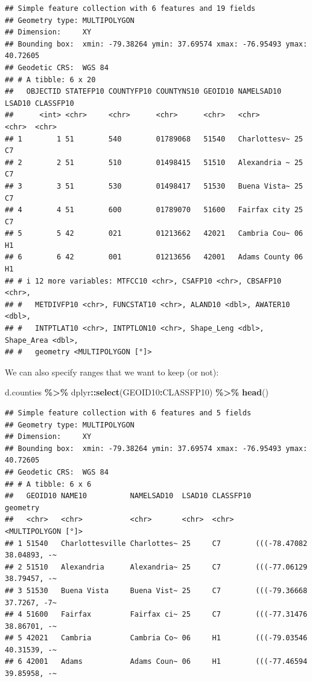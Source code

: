 \documentclass[]{article}
\newenvironment{Shaded}{\begin{snugshade}}{\end{snugshade}}
\newcommand{\FunctionTok}[1]{\textcolor[rgb]{0.13,0.29,0.53}{\textbf{#1}}}
\newcommand{\NormalTok}[1]{#1}
\newcommand{\SpecialCharTok}[1]{\textcolor[rgb]{0.81,0.36,0.00}{\textbf{#1}}}
\begin{document}
\begin{verbatim}
## Simple feature collection with 6 features and 19 fields
## Geometry type: MULTIPOLYGON
## Dimension:     XY
## Bounding box:  xmin: -79.38264 ymin: 37.69574 xmax: -76.95493 ymax: 40.72605
## Geodetic CRS:  WGS 84
## # A tibble: 6 x 20
##   OBJECTID STATEFP10 COUNTYFP10 COUNTYNS10 GEOID10 NAMELSAD10   LSAD10 CLASSFP10
##      <int> <chr>     <chr>      <chr>      <chr>   <chr>        <chr>  <chr>    
## 1        1 51        540        01789068   51540   Charlottesv~ 25     C7       
## 2        2 51        510        01498415   51510   Alexandria ~ 25     C7       
## 3        3 51        530        01498417   51530   Buena Vista~ 25     C7       
## 4        4 51        600        01789070   51600   Fairfax city 25     C7       
## 5        5 42        021        01213662   42021   Cambria Cou~ 06     H1       
## 6        6 42        001        01213656   42001   Adams County 06     H1       
## # i 12 more variables: MTFCC10 <chr>, CSAFP10 <chr>, CBSAFP10 <chr>,
## #   METDIVFP10 <chr>, FUNCSTAT10 <chr>, ALAND10 <dbl>, AWATER10 <dbl>,
## #   INTPTLAT10 <chr>, INTPTLON10 <chr>, Shape_Leng <dbl>, Shape_Area <dbl>,
## #   geometry <MULTIPOLYGON [°]>
\end{verbatim}

We can also specify ranges that we want to keep (or not):

\begin{Shaded}
\begin{Highlighting}[]
\NormalTok{d.counties }\SpecialCharTok{\%\textgreater{}\%}\NormalTok{ dplyr}\SpecialCharTok{::}\FunctionTok{select}\NormalTok{(GEOID10}\SpecialCharTok{:}\NormalTok{CLASSFP10) }\SpecialCharTok{\%\textgreater{}\%} \FunctionTok{head}\NormalTok{() }
\end{Highlighting}
\end{Shaded}

\begin{verbatim}
## Simple feature collection with 6 features and 5 fields
## Geometry type: MULTIPOLYGON
## Dimension:     XY
## Bounding box:  xmin: -79.38264 ymin: 37.69574 xmax: -76.95493 ymax: 40.72605
## Geodetic CRS:  WGS 84
## # A tibble: 6 x 6
##   GEOID10 NAME10          NAMELSAD10  LSAD10 CLASSFP10                  geometry
##   <chr>   <chr>           <chr>       <chr>  <chr>            <MULTIPOLYGON [°]>
## 1 51540   Charlottesville Charlottes~ 25     C7        (((-78.47082 38.04893, -~
## 2 51510   Alexandria      Alexandria~ 25     C7        (((-77.06129 38.79457, -~
## 3 51530   Buena Vista     Buena Vist~ 25     C7        (((-79.36668 37.7267, -7~
## 4 51600   Fairfax         Fairfax ci~ 25     C7        (((-77.31476 38.86701, -~
## 5 42021   Cambria         Cambria Co~ 06     H1        (((-79.03546 40.31539, -~
## 6 42001   Adams           Adams Coun~ 06     H1        (((-77.46594 39.85958, -~
\end{verbatim}
\end{document}
